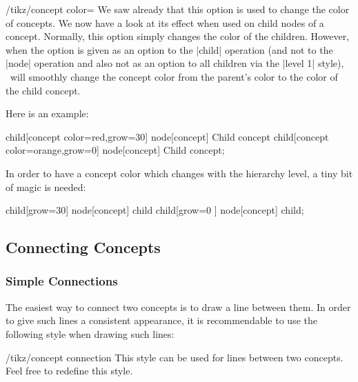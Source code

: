 \begin{key}{/tikz/concept color=}
    We saw already that this option is used to change the color of concepts. We
    now have a look at its effect when used on child nodes of a concept.
    Normally, this option simply changes the color of the children. However,
    when the option is given as an option to the |child| operation (and not to
    the |node| operation and also not as an option to all children via the
    |level 1| style), \tikzname\ will smoothly change the concept color from
    the parent's color to the color of the child concept.

    Here is an example:
\begin{codeexample}[preamble={\usetikzlibrary{mindmap}}]
\tikz[mindmap,concept color=blue!80]
    child[concept color=red,grow=30] {node[concept] {Child concept}}
    child[concept color=orange,grow=0]  {node[concept] {Child concept}};
\end{codeexample}

    In order to have a concept color which changes with the hierarchy level, a
    tiny bit of magic is needed:
\begin{codeexample}[preamble={\usetikzlibrary{mindmap}}]
\tikz[mindmap,text=white,
      root concept/.style={concept color=blue},
      level 1 concept/.append style=
        {every child/.style={concept color=blue!50}}]
    child[grow=30] {node[concept] {child}}
    child[grow=0 ] {node[concept] {child}};
\end{codeexample}
\end{key}


\subsection{Connecting Concepts}

\subsubsection{Simple Connections}

The easiest way to connect two concepts is to draw a line between them. In
order to give such lines a consistent appearance, it is recommendable to use
the following style when drawing such lines:

\begin{stylekey}{/tikz/concept connection}
    This style can be used for lines between two concepts. Feel free to
    redefine this style.
\end{stylekey}

